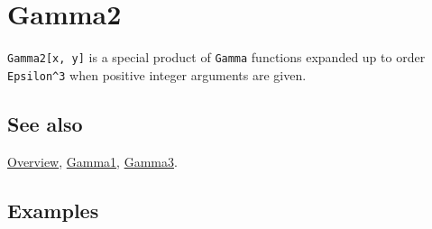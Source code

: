 \documentclass[../FeynCalcManual.tex]{subfiles}
\begin{document}
\hypertarget{gamma2}{%
\section{Gamma2}\label{gamma2}}

\texttt{Gamma2[\allowbreak{}x,\ \allowbreak{}y]} is a special product of
\texttt{Gamma} functions expanded up to order \texttt{Epsilon^3} when
positive integer arguments are given.

\subsection{See also}

\hyperlink{toc}{Overview}, \hyperlink{gamma1}{Gamma1},
\hyperlink{gamma3}{Gamma3}.

\subsection{Examples}
\end{document}
